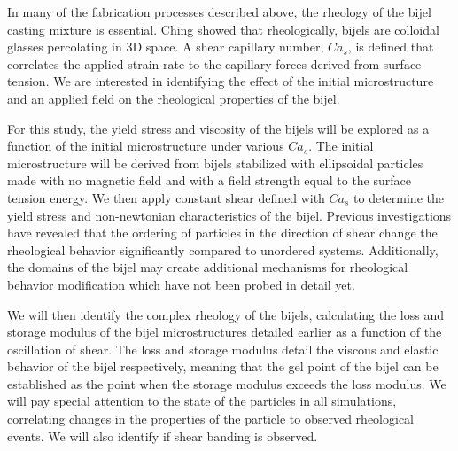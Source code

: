 In many of the fabrication processes described above, the rheology of the bijel casting mixture is essential. 
\cite{haase_continuous_2015, cai_bijels_2017, amirfattahi_fabrication_2024} Ching showed that rheologically, bijels are 
colloidal glasses percolating in 3D space. \cite{ching_bijel_2022} A shear capillary number, $Ca_s$, is defined that correlates the 
applied strain rate to the capillary forces derived from surface tension. \cite{frijters_effects_2012, yang_capillary_2022} We are interested 
in identifying the effect of the initial microstructure and an applied field on the rheological properties of the bijel.


For this study, the yield stress and viscosity of the bijels will be explored as a function of the initial microstructure under 
various $Ca_s$. The initial microstructure will be derived from bijels stabilized with ellipsoidal particles made with no magnetic field 
and with a field strength equal to the surface tension energy. We then apply constant shear defined with $Ca_s$ to determine the yield stress and non-newtonian
characteristics of the bijel. Previous investigations have revealed that the ordering of particles in the direction of shear change
the rheological behavior significantly compared to unordered systems. Additionally, the domains of the bijel may create additional mechanisms for 
rheological behavior modification which have not been probed in detail yet. 

We will then identify the complex rheology of the bijels, calculating the loss and storage modulus of the bijel microstructures detailed earlier
as a function of the oscillation of shear. The loss and storage modulus detail the viscous and elastic behavior of the bijel respectively, meaning 
that the gel point of the bijel can be established as the point when the storage modulus exceeds the loss modulus. We will pay special attention to the 
state of the particles in all simulations, correlating changes in the properties of the particle to observed rheological events. We will also identify if shear banding
is observed. 